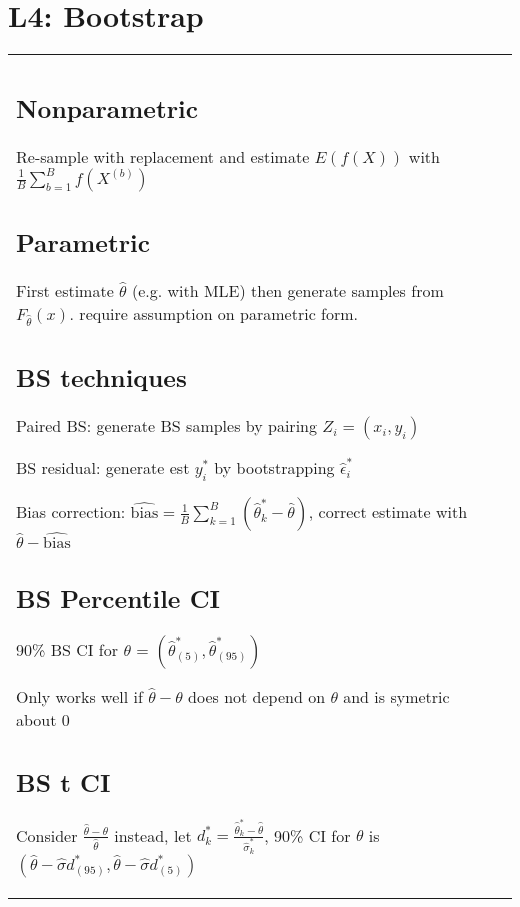\section{L4: Bootstrap}

\begin{tabulary}{\textwidth}{l L}

\subsection{Nonparametric}

Re-sample with replacement and estimate $E(f(X))$ with $\frac{1}{B}\sum_{b=1}^B f(X^{(b)})$

\subsection{Parametric}

First estimate $\hat\theta$ (e.g. with MLE) then generate samples from $F_{\hat\theta}(x)$. require assumption on parametric form.

\subsection{BS techniques}

Paired BS: generate BS samples by pairing $Z_i = (x_i, y_i)$

BS residual: generate est $y_i^*$ by bootstrapping $\hat\epsilon_i^*$

Bias correction: $\hat{\text{bias}} = \frac{1}{B}\sum_{k=1}^B (\hat\theta_k^* - \hat\theta)$, correct estimate with $\hat\theta - \hat{\text{bias}}$

\subsection{BS Percentile CI}

90\% BS CI for $\theta$ = $\left(\hat\theta^*_{(5)}, \hat\theta^*_{(95)}\right)$

Only works well if $\hat\theta - \theta$ does not depend on $\theta$ and is symetric about 0

\subsection{BS t CI}

Consider $\frac{\hat\theta - \theta}{\hat\theta}$ instead, let $d^*_k = \frac{\hat\theta_k^* - \hat\theta}{\hat\sigma^*_k}$,
90\% CI for $\theta$ is $(\hat\theta - \hat\sigma d^*_{(95)}, \hat\theta - \hat\sigma d^*_{(5)})$


\end{tabulary}
